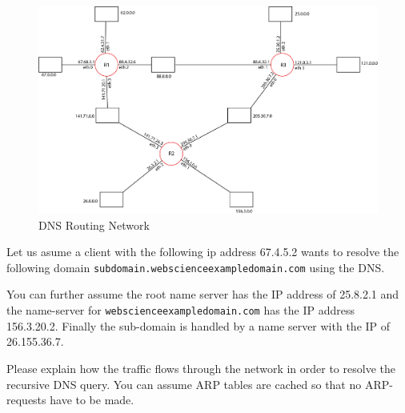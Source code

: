\documentclass{WeSTassignment}
\begin{document}
\begin{figure}[h]
  \centering
  \includegraphics[scale=0.45]{ass3_DNS.png}
   \caption{DNS Routing Network}
     \label{fig:routing} 
\end{figure}

Let us asume a client with the following ip address 67.4.5.2 wants to resolve the following domain  \texttt{subdomain.webscienceexampledomain.com} using the DNS.

You can further assume the root name server has the IP address of 25.8.2.1 and the name-server for \texttt{webscienceexampledomain.com} has the IP address 156.3.20.2. 
Finally the sub-domain is handled by a name server with the IP of 26.155.36.7. 

Please explain how the traffic flows through the network in order to resolve the recursive DNS query. You can assume ARP tables are cached so that no ARP-requests have to be made. 
\end{document}
